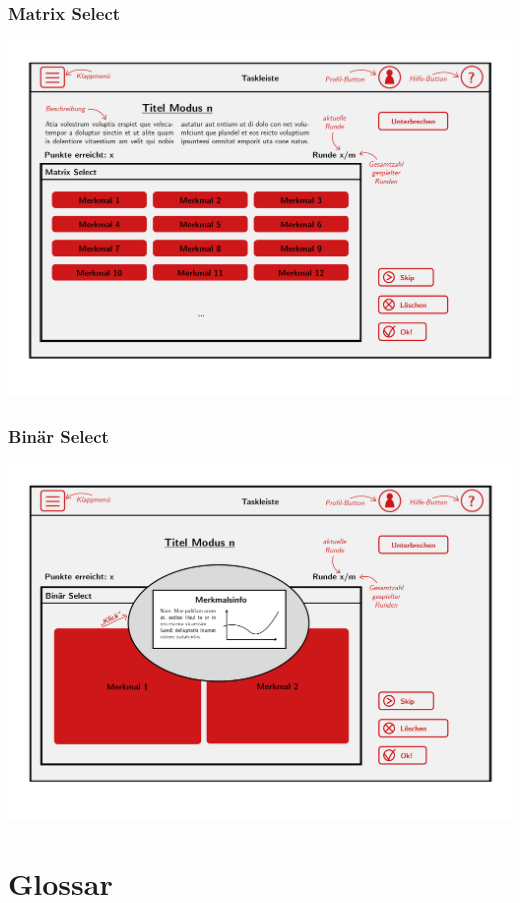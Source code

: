 \documentclass[a4paper]{scrreprt}
\begin{document}
    \subsection{Matrix Select}
    \centering
    \includegraphics[width=\textwidth]{../pictures/MatrixSelect.jpg}
    \subsection{Binär Select}
    \centering
    \includegraphics[width=\textwidth]{../pictures/BinSelect.jpg}

    \clearpage


    \chapter{Glossar}
    \printglossary
    
\end{document}
